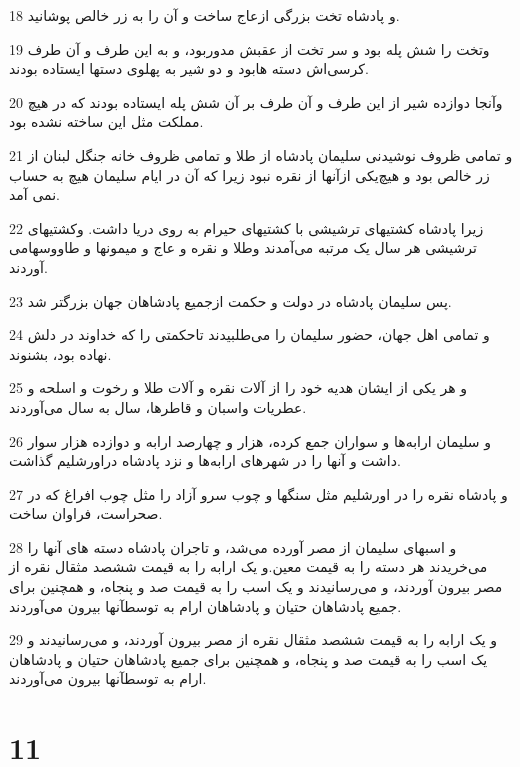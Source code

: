 \par 18 و پادشاه تخت بزرگی ازعاج ساخت و آن را به زر خالص پوشانید.
\par 19 وتخت را شش پله بود و سر تخت از عقبش مدوربود، و به این طرف و آن طرف کرسی‌اش دسته هابود و دو شیر به پهلوی دستها ایستاده بودند.
\par 20 وآنجا دوازده شیر از این طرف و آن طرف بر آن شش پله ایستاده بودند که در هیچ مملکت مثل این ساخته نشده بود.
\par 21 و تمامی ظروف نوشیدنی سلیمان پادشاه از طلا و تمامی ظروف خانه جنگل لبنان از زر خالص بود و هیچ‌یکی ازآنها از نقره نبود زیرا که آن در ایام سلیمان هیچ به حساب نمی آمد.
\par 22 زیرا پادشاه کشتیهای ترشیشی با کشتیهای حیرام به روی دریا داشت. وکشتیهای ترشیشی هر سال یک مرتبه می‌آمدند وطلا و نقره و عاج و میمونها و طاووسهامی آوردند.
\par 23 پس سلیمان پادشاه در دولت و حکمت ازجمیع پادشاهان جهان بزرگتر شد.
\par 24 و تمامی اهل جهان، حضور سلیمان را می‌طلبیدند تاحکمتی را که خداوند در دلش نهاده بود، بشنوند.
\par 25 و هر یکی از ایشان هدیه خود را از آلات نقره و آلات طلا و رخوت و اسلحه و عطریات واسبان و قاطرها، سال به سال می‌آوردند.
\par 26 و سلیمان ارابه‌ها و سواران جمع کرده، هزار و چهارصد ارابه و دوازده هزار سوار داشت و آنها را در شهرهای ارابه‌ها و نزد پادشاه دراورشلیم گذاشت. 
\par 27 و پادشاه نقره را در اورشلیم مثل سنگها و چوب سرو آزاد را مثل چوب افراغ که در صحراست، فراوان ساخت.
\par 28 و اسبهای سلیمان از مصر آورده می‌شد، و تاجران پادشاه دسته های آنها را می‌خریدند هر دسته را به قیمت معین.و یک ارابه را به قیمت ششصد مثقال نقره از مصر بیرون آوردند، و می‌رسانیدند و یک اسب را به قیمت صد و پنجاه، و همچنین برای جمیع پادشاهان حتیان و پادشاهان ارام به توسطآنها بیرون می‌آوردند.
\par 29 و یک ارابه را به قیمت ششصد مثقال نقره از مصر بیرون آوردند، و می‌رسانیدند و یک اسب را به قیمت صد و پنجاه، و همچنین برای جمیع پادشاهان حتیان و پادشاهان ارام به توسطآنها بیرون می‌آوردند.
 
\chapter{11}

